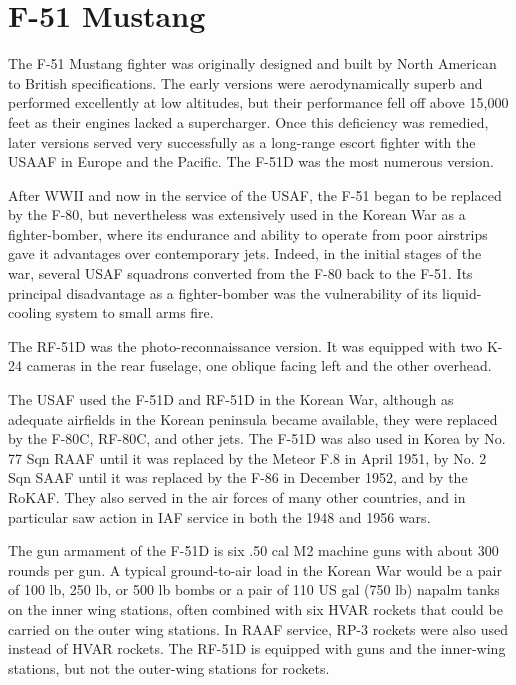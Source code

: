 \section*{F-51 Mustang}


The F-51 Mustang fighter was originally designed and built by North American to British specifications. The early versions were aerodynamically superb and performed excellently at low altitudes, but their performance fell off above 15,000 feet as their engines lacked a supercharger. Once this deficiency was remedied, later versions served very successfully as a long-range escort fighter with the USAAF in Europe and the Pacific. The F-51D was the most numerous version.

After WWII and now in the service of the USAF, the F-51 began to be replaced by the F-80, but nevertheless was extensively used in the Korean War as a fighter-bomber, where its endurance and ability to operate from poor airstrips gave it advantages over contemporary jets. Indeed, in the initial stages of the war, several USAF squadrons converted from the F-80 back to the F-51. Its principal disadvantage as a fighter-bomber was the vulnerability of its liquid-cooling system to small arms fire.

The RF-51D was the photo-reconnaissance version. It was equipped with two K-24 cameras in the rear fuselage, one oblique facing left and the other overhead. 

The USAF used the F-51D and RF-51D in the Korean War, although as adequate airfields in the Korean peninsula became available, they were replaced by the F-80C, RF-80C, and other jets. The F-51D was also used in Korea by No. 77 Sqn RAAF until it was replaced by the Meteor F.8 in April 1951, by No. 2 Sqn SAAF until it was replaced by the F-86 in December 1952, and by the RoKAF. They also served in the air forces of many other countries, and in particular saw action in IAF service in both the 1948 and 1956 wars. 

The gun armament of the F-51D is six .50 cal M2 machine guns with about 300 rounds per gun. A typical ground-to-air load in the Korean War would be a pair of 100 lb, 250 lb, or 500 lb bombs or a pair of 110 US gal (750 lb) napalm tanks on the inner wing stations, often combined with six HVAR rockets that could be carried on the outer wing stations. In RAAF service, RP-3 rockets were also used instead of HVAR rockets. The RF-51D is equipped with guns and the inner-wing stations, but not the outer-wing stations for rockets.

